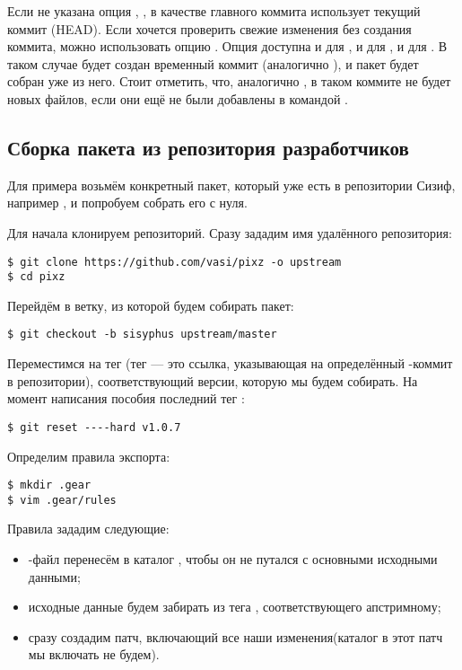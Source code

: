 Если не указана опция , , в качестве главного коммита использует текущий
коммит (HEAD). Если хочется проверить свежие изменения без создания коммита, можно использовать опцию
. Опция  доступна и для , и для , и для . В таком случае
будет создан временный коммит (аналогично ), и пакет будет собран уже из него.
Стоит отметить, что, аналогично , в таком коммите не будет новых файлов, если они
ещё не были добавлены в  командой .

\subsection*{Сборка пакета из репозитория разработчиков}

Для примера возьмём конкретный пакет, который уже есть в репозитории Сизиф, например , и попробуем
собрать его с нуля.

Для начала клонируем репозиторий. Сразу зададим имя удалённого репозитория:
\begin{verbatim}
$ git clone https://github.com/vasi/pixz -o upstream
$ cd pixz
\end{verbatim}

Перейдём в ветку, из которой будем собирать пакет:
\begin{verbatim}
$ git checkout -b sisyphus upstream/master
\end{verbatim}

Переместимся на тег (тег --- это ссылка, указывающая на определённый -коммит в репозитории),
соответствующий версии, которую мы будем собирать. На момент написания пособия последний тег :
\begin{verbatim}
$ git reset ----hard v1.0.7
\end{verbatim}

Определим правила экспорта:
\begin{verbatim}
$ mkdir .gear
$ vim .gear/rules
\end{verbatim}

Правила зададим следующие:
\begin{itemize}
	\item {}-файл перенесём в каталог , чтобы он не путался с основными исходными данными;
	\item исходные данные будем забирать из тега , соответствующего апстримному;
	\item сразу создадим патч, включающий все наши изменения(каталог  в этот патч мы включать не будем).
\end{itemize}

